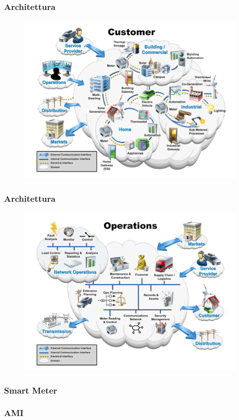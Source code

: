 \begin{frame}[fragile]
  \frametitle{Architettura}
	\begin{figure}[h] 
		\includegraphics[scale=0.6]{imgs/cust.png}
	\end{figure}
\end{frame}

\begin{frame}[fragile]
  \frametitle{Architettura}
	\begin{figure}[h] 
		\includegraphics[scale=0.6]{imgs/ope.png}
	\end{figure}
\end{frame}

%

\begin{frame}[fragile]
  \frametitle{Smart Meter}

\end{frame}

\begin{frame}[fragile]
  \frametitle{AMI}

\end{frame}
